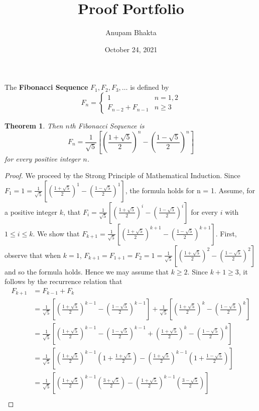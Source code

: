 \documentclass[11pt]{article}
\date{October 24, 2021}
\title{Proof Portfolio}
\author{Anupam Bhakta}
\newtheorem{theorem}{Theorem}
\begin{document}
	
\maketitle

\noindent The {\bf Fibonacci Sequence} $F_1, F_2, F_3, \dots$ is defined by 
\[F_n=\begin{cases}1& n=1,2\\F_{n-2}+F_{n-1}&n\ge 3\end{cases}\]

\begin{theorem}
Then $n$th Fibonacci Sequence is 
\[F_n=\frac{1}{\sqrt{5}}\left[\left(\frac{1+\sqrt{5}}{2}\right)^n-\left(\frac{1-\sqrt{5}}{2}\right)^n\right]\]
for every positive integer $n$.
\end{theorem}

\begin{proof}
	We proceed by the Strong Principle of Mathematical Induction. Since $F_1 = 1 = \frac{1}{\sqrt{5}}\left[\left(\frac{1+\sqrt{5}}{2}\right)^1-\left(\frac{1-\sqrt{5}}{2}\right)^1\right]$, the formula holds for n = 1. Assume, for a positive integer $k$, that $F_i = \frac{1}{\sqrt{5}}\left[\left(\frac{1+\sqrt{5}}{2}\right)^i-\left(\frac{1-\sqrt{5}}{2}\right)^i\right]$ for every $i$ with $1\le i\le k$. We show that $F_{k+1} = \frac{1}{\sqrt{5}}\left[\left(\frac{1+\sqrt{5}}{2}\right)^{k+1}-\left(\frac{1-\sqrt{5}}{2}\right)^{k+1}\right]$. First, observe that when $k=1$, $F_{k+1} = F_{1+1} = F_2 = 1 = \frac{1}{\sqrt{5}}\left[\left(\frac{1+\sqrt{5}}{2}\right)^2-\left(\frac{1-\sqrt{5}}{2}\right)^2\right]$ and so the formula holds. Hence we may assume that $k\ge2$. Since $k+1\ge3$, it follows by the recurrence relation that
	\begin{align}
		F_{k+1} &= F_{k-1}+F_k \\
		&= \frac{1}{\sqrt{5}}\left[\left(\frac{1+\sqrt{5}}{2}\right)^{k-1}-\left(\frac{1-\sqrt{5}}{2}\right)^{k-1}\right] + \frac{1}{\sqrt{5}}\left[\left(\frac{1+\sqrt{5}}{2}\right)^{k}-\left(\frac{1-\sqrt{5}}{2}\right)^{k}\right] \\
		&= \frac{1}{\sqrt{5}}\left[\left(\frac{1+\sqrt{5}}{2}\right)^{k-1}-\left(\frac{1-\sqrt{5}}{2}\right)^{k-1} + \left(\frac{1+\sqrt{5}}{2}\right)^{k}-\left(\frac{1-\sqrt{5}}{2}\right)^{k}\right] \\
		&= \frac{1}{\sqrt{5}}\left[\left(\frac{1+\sqrt{5}}{2}\right)^{k-1}\left(1+ \frac{1+\sqrt{5}}{2}\right) - \left(\frac{1+\sqrt{5}}{2}\right)^{k-1}\left(1+\frac{1-\sqrt{5}}{2}\right)\right] \\
		&= \frac{1}{\sqrt{5}}\left[\left(\frac{1+\sqrt{5}}{2}\right)^{k-1}\left(\frac{3+\sqrt{5}}{2}\right) - \left(\frac{1+\sqrt{5}}{2}\right)^{k-1}\left(\frac{3-\sqrt{5}}{2}\right)\right] \\

\end{align}
\end{proof}
\end{document}
